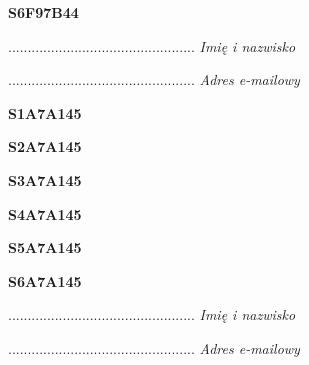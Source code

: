 \begin{turn}{90}\huge \textbf{S6F97B44}\end{turn}

\begin{turn}{90}\begin{minipage}{\linewidth} \vspace{20mm} ................................................  \textit{Imię i nazwisko}\end{minipage}\end{turn}

\begin{turn}{90}\begin{minipage}{\linewidth} \vspace{20mm} ................................................  \textit{Adres e-mailowy}\end{minipage}\end{turn}

\begin{turn}{90}\huge \textbf{S1A7A145}\end{turn}

\begin{turn}{90}\huge \textbf{S2A7A145}\end{turn}

\begin{turn}{90}\huge \textbf{S3A7A145}\end{turn}

\begin{turn}{90}\huge \textbf{S4A7A145}\end{turn}

\begin{turn}{90}\huge \textbf{S5A7A145}\end{turn}

\begin{turn}{90}\huge \textbf{S6A7A145}\end{turn}

\begin{turn}{90}\begin{minipage}{\linewidth} \vspace{20mm} ................................................  \textit{Imię i nazwisko}\end{minipage}\end{turn}

\begin{turn}{90}\begin{minipage}{\linewidth} \vspace{20mm} ................................................  \textit{Adres e-mailowy}\end{minipage}\end{turn}

